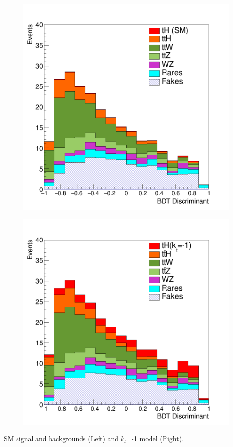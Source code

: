 \documentclass[11pt]{beamer}
\begin{document}
\begin{frame}
\begin{minipage}[b]{.48\textwidth}
\begin{figure}
	\centering
	\includegraphics[width=\textwidth]{figures/kos.png}
\end{figure}
\end{minipage}
\hfill
\begin{minipage}[b]{.48\textwidth}
	\begin{figure}
		\centering
		\includegraphics[width=\textwidth]{figures/kos2.png}
	\end{figure}
\end{minipage}
\begin{center}
\small{SM signal and backgrounds (Left) and $k_t$=-1 model (Right).}
\end{center}
\end{frame}
\end{document}
